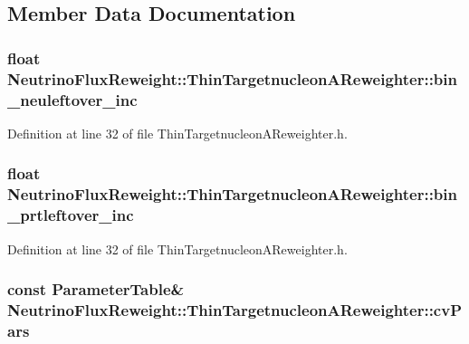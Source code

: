 \subsection{Member Data Documentation}
\hypertarget{class_neutrino_flux_reweight_1_1_thin_targetnucleon_a_reweighter_a6c16f1fc945e36479f96e918392710f3}{
\subsubsection[{bin\-\_\-neuleftover\-\_\-inc}]{\setlength{\rightskip}{0pt plus 5cm}float Neutrino\-Flux\-Reweight\-::\-Thin\-Targetnucleon\-A\-Reweighter\-::bin\-\_\-neuleftover\-\_\-inc}}\label{class_neutrino_flux_reweight_1_1_thin_targetnucleon_a_reweighter_a6c16f1fc945e36479f96e918392710f3}


Definition at line 32 of file Thin\-Targetnucleon\-A\-Reweighter.\-h.

\hypertarget{class_neutrino_flux_reweight_1_1_thin_targetnucleon_a_reweighter_a70d7724eabbb284c4a6c145d8abd9dd4}{
\subsubsection[{bin\-\_\-prtleftover\-\_\-inc}]{\setlength{\rightskip}{0pt plus 5cm}float Neutrino\-Flux\-Reweight\-::\-Thin\-Targetnucleon\-A\-Reweighter\-::bin\-\_\-prtleftover\-\_\-inc}}\label{class_neutrino_flux_reweight_1_1_thin_targetnucleon_a_reweighter_a70d7724eabbb284c4a6c145d8abd9dd4}


Definition at line 32 of file Thin\-Targetnucleon\-A\-Reweighter.\-h.

\hypertarget{class_neutrino_flux_reweight_1_1_thin_targetnucleon_a_reweighter_aa2690e0e126d75bbcb68ec28c8c4811a}{
\subsubsection[{cv\-Pars}]{\setlength{\rightskip}{0pt plus 5cm}const {\bf Parameter\-Table}\& Neutrino\-Flux\-Reweight\-::\-Thin\-Targetnucleon\-A\-Reweighter\-::cv\-Pars\hspace{0.3cm}{\ttfamily [private]}}}\label{class_neutrino_flux_reweight_1_1_thin_targetnucleon_a_reweighter_aa2690e0e126d75bbcb68ec28c8c4811a}


